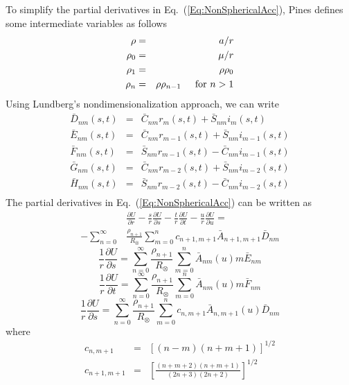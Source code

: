 To simplify the partial derivatives in
Eq.~(\ref{Eq:NonSphericalAcc}), Pines defines some intermediate
variables as follows
%
\begin{eqnarray}
     \rho   & = & a/r \\
     \rho_0 & = & \mu/r \nonumber \\
     \rho_1 & = & \rho \rho_0 \\
     \rho_n & = & \rho \rho_{n-1} \hspace{.2 in} \mbox{for $n>1$}\nonumber
\end{eqnarray}
%
Using Lundberg's nondimensionalization approach, we can write
%
\begin{eqnarray}
     \bar{D}_{nm}(s,t) & = & \bar{C}_{nm}r_m(s,t) + \bar{S}_{nm}i_m(s,t) \nonumber\\
     \bar{E}_{nm}(s,t) & = & \bar{C}_{nm}r_{m-1}(s,t) + \bar{S}_{nm}i_{m-1}(s,t) \nonumber\\
     \bar{F}_{nm}(s,t) & = & \bar{S}_{nm}r_{m-1}(s,t) - \bar{C}_{nm}i_{m-1}(s,t) \nonumber\\
     \bar{G}_{nm}(s,t) & = & \bar{C}_{nm}r_{m-2}(s,t) + \bar{S}_{nm}i_{m-2}(s,t) \nonumber\\
     \bar{H}_{nm}(s,t) & = & \bar{S}_{nm}r_{m-2}(s,t) - \bar{C}_{nm}i_{m-2}(s,t) \nonumber\\
\end{eqnarray}
%
The partial derivatives in Eq.~(\ref{Eq:NonSphericalAcc}) can be
written as
%
\begin{equation}
    \begin{split}
   &\frac{\partial U}{\partial r} - \frac{s}{r}\frac{\partial U}{\partial s}
    -\frac{t}{r}\frac{\partial U}{\partial t} -\frac{u}{r}\frac{\partial U}{\partial u}
     =\\
     -\sum_{n=0}^{\infty}&\frac{\rho_{n+1}}{R_\otimes}\sum_{m=0}^{n}c_{n+1,m+1}\bar{A}_{n+1,m+1}\bar{D}_{nm}
    \end{split} \label{Eq:a4}
\end{equation}
%
\begin{equation}
    \frac{1}{r}\frac{\partial U}{\partial s} =
    \sum_{n=0}^{\infty}\frac{\rho_{n+1}}{R_\otimes}\sum_{m=0}^{n}\bar{A}_{nm}(u) m \bar{E}_{nm}
\end{equation}
%
\begin{equation}
    \frac{1}{r}\frac{\partial U}{\partial t} =
    \sum_{n=0}^{\infty}\frac{\rho_{n+1}}{R_\otimes}\sum_{m=0}^{n}\bar{A}_{nm}(u) m \bar{F}_{nm}
\end{equation}
%
\begin{equation}
    \frac{1}{r}\frac{\partial U}{\partial s} =
    \sum_{n=0}^{\infty}\frac{\rho_{n+1}}{R_\otimes}\sum_{m=0}^{n}c_{n,m+1}\bar{A}_{n,m+1}(u)\bar{D}_{nm}
\end{equation}
%
where
%
\begin{eqnarray}
    c_{n,m+1}   & = & \left[(n-m)(n+m+1) \right]^{1/2}  \nonumber\\
    c_{n+1,m+1} & = & \left[\frac{( n + m + 2) (n + m + 1 )}{(2n+3)(2n+2)}
    \right]^{1/2}  \nonumber
\end{eqnarray}


